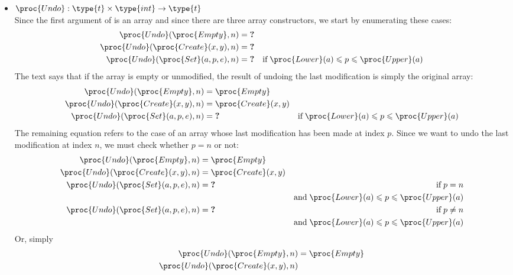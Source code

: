 \begin{itemize}
    \item \(\proc{Undo} : \type{t} \times \type{int} \rightarrow
    \type{t}\)\\
    Since the first argument of  is an array and since
    there are three array constructors, we start by enumerating these
    cases:
    \begin{align*}
       \proc{Undo} (\proc{Empty}, n)
    &= \textbf{?}\\
       \proc{Undo} (\proc{Create} (x, y), n)
    &= \textbf{?}\\
       \proc{Undo} (\proc{Set} (a, p, e), n)
    &= \textbf{?}
    & \text{if} \; \proc{Lower} (a) \leqslant p \leqslant \proc{Upper} (a)
    \end{align*}
    The text says that if the array is empty or unmodified, the result
    of undoing the last modification is simply the original array:
    \begin{align*}
       \proc{Undo} (\proc{Empty}, n)
    &= \proc{Empty}\\
       \proc{Undo} (\proc{Create} (x, y), n)
    &= \proc{Create} (x, y)\\
       \proc{Undo} (\proc{Set} (a, p, e), n)
    &= \textbf{?}
    & \text{if} \; \proc{Lower} (a) \leqslant p \leqslant \proc{Upper} (a)
    \end{align*}
    The remaining equation refers to the case of an array whose last
    modification has been made at index \(p\). Since we want to undo
    the last modification at index \(n\), we must check whether \(p =
    n\) or not:
    \begin{align*}
       \proc{Undo} (\proc{Empty}, n)
    &= \proc{Empty}\\
       \proc{Undo} (\proc{Create} (x, y), n)
    &= \proc{Create} (x, y)\\
       \proc{Undo} (\proc{Set} (a, p, e), n)
    &= \textbf{?}
    & \text{if} \; p = n\\
    && \text{and} \; \proc{Lower} (a) \leqslant p
      \leqslant \proc{Upper} (a)\\
       \proc{Undo} (\proc{Set} (a, p, e), n)
    &= \textbf{?}
    & \text{if} \; p \neq n\\
    && \text{and} \; \proc{Lower} (a) \leqslant p
      \leqslant \proc{Upper} (a)
    \end{align*}
    Or, simply
    \begin{align*}
       \proc{Undo} (\proc{Empty}, n)
    &= \proc{Empty}\\
       \proc{Undo} (\proc{Create} (x, y), n)

\end{align*}
\end{itemize}
